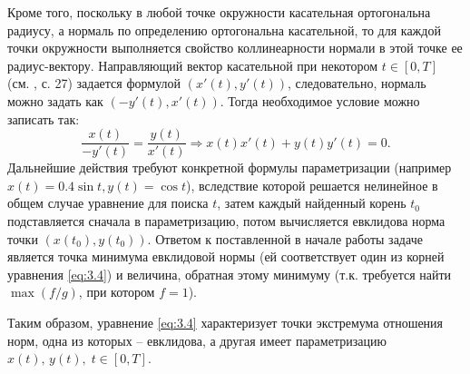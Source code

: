 \documentclass{article}
\begin{document}
Кроме того, поскольку в любой точке окружности касательная ортогональна радиусу, а нормаль по определению ортогональна касательной, то для каждой точки окружности выполняется свойство коллинеарности нормали в этой точке ее радиус-вектору.
Направляющий вектор касательной при некотором $t \in [0, T]$ (см. \cite{Ignatyev}, с. 27) задается формулой $(x'(t), y'(t))$, следовательно, нормаль можно задать как $(-y'(t), x'(t))$. Тогда необходимое условие можно записать так:
\begin{equation} \label{eq:3.4}
\frac{x(t)}{-y'(t)} = \frac{y(t)}{x'(t)} \Rightarrow x(t)x'(t) + y(t)y'(t) = 0.
\end{equation}
Дальнейшие действия требуют конкретной формулы параметризации (например $x(t) = 0.4\sin{t}, y(t) = \cos{t}$), вследствие которой решается нелинейное в общем случае уравнение для поиска $t$, затем каждый найденный корень $t_0$ подставляется сначала в параметризацию, потом вычисляется евклидова норма точки
\newline 
$(x(t_0), y(t_0))$. Ответом к поставленной в начале работы задаче является точка минимума евклидовой нормы (ей соответствует один из корней уравнения \eqref{eq:3.4}) и величина, обратная этому минимуму (т.к. требуется найти $\max{(f/g)}$, при котором $f=1$).

\vspace{1mm}
Таким образом, уравнение \eqref{eq:3.4} характеризует точки экстремума отношения норм, одна из которых -- евклидова, а другая имеет параметризацию $x(t), \, y(t), \; t \in [0, T] $.
\end{document}

